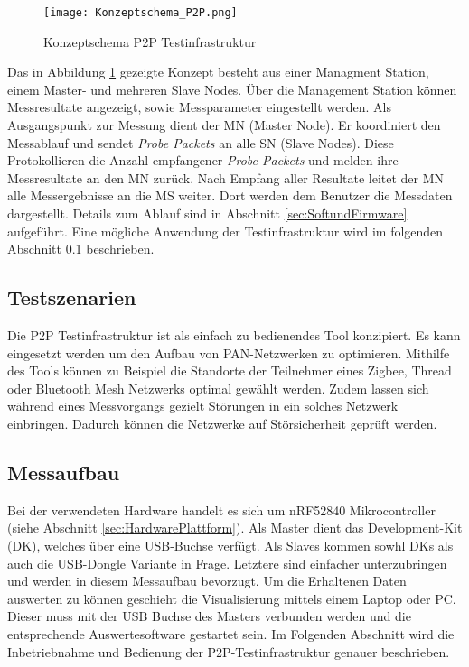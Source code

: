 \begin{figure} [H]
	\centering
	\texttt{[image: Konzeptschema\_P2P.png]}
	\caption{Konzeptschema P2P Testinfrastruktur}
	\label{fig:KonzeptschemaP2P}
\end{figure}

Das in Abbildung \ref{fig:KonzeptschemaP2P} gezeigte Konzept besteht aus einer Managment Station, einem Master- und mehreren Slave Nodes. Über die Management Station können Messresultate angezeigt, sowie Messparameter eingestellt werden. Als Ausgangspunkt zur Messung dient der MN (Master Node). Er koordiniert den Messablauf und sendet \textit{Probe Packets} an alle SN (Slave Nodes). Diese Protokollieren die Anzahl empfangener \textit{Probe Packets} und melden ihre Messresultate an den MN zurück. Nach Empfang aller Resultate leitet der MN alle Messergebnisse an die MS weiter. Dort werden dem Benutzer die Messdaten dargestellt. Details zum Ablauf sind in Abschnitt \ref{sec:SoftundFirmware} aufgeführt. Eine mögliche Anwendung der Testinfrastruktur wird im folgenden Abschnitt \ref{sec:TestszenarienP2P} beschrieben.  

\subsection{Testszenarien}\label{sec:TestszenarienP2P}

Die P2P Testinfrastruktur ist als einfach zu bedienendes Tool konzipiert. Es kann eingesetzt werden um den Aufbau von PAN-Netzwerken zu optimieren. Mithilfe des Tools können zu Beispiel die Standorte der Teilnehmer eines Zigbee, Thread oder Bluetooth Mesh Netzwerks optimal gewählt werden. Zudem lassen sich während eines Messvorgangs gezielt Störungen in ein solches Netzwerk einbringen. Dadurch können die Netzwerke auf Störsicherheit geprüft werden. 



\subsection{Messaufbau}\label{sec:Messaufbau}

Bei der verwendeten Hardware handelt es sich um nRF52840 Mikrocontroller (siehe Abschnitt \ref{sec:HardwarePlattform}). Als Master dient das Development-Kit (DK), welches über eine USB-Buchse verfügt. Als Slaves kommen sowhl DKs als auch die USB-Dongle Variante in Frage. Letztere sind einfacher unterzubringen und werden in diesem Messaufbau bevorzugt. Um die Erhaltenen Daten auswerten zu können geschieht die Visualisierung mittels einem Laptop oder PC. Dieser muss mit der USB Buchse des Masters verbunden werden und die entsprechende Auswertesoftware gestartet sein. Im Folgenden Abschnitt wird die Inbetriebnahme und Bedienung der P2P-Testinfrastruktur genauer beschrieben. 

